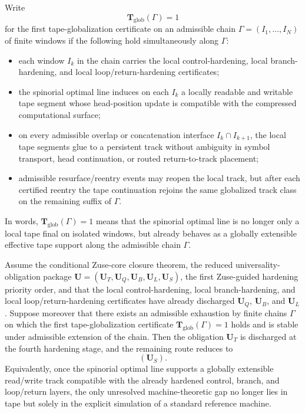 \begin{definition}
Write
\[
\mathbf T_{\mathrm{glob}}(\Gamma)=1
\]
for the first tape-globalization certificate on an admissible chain $\Gamma=(I_1,\dots,I_N)$ of finite windows if the following hold simultaneously along $\Gamma$:
\begin{itemize}[leftmargin=2em]
 \item each window $I_k$ in the chain carries the local control-hardening, local branch-hardening, and local loop/return-hardening certificates;
 \item the spinorial optimal line induces on each $I_k$ a locally readable and writable tape segment whose head-position update is compatible with the compressed computational surface;
 \item on every admissible overlap or concatenation interface $I_k\cap I_{k+1}$, the local tape segments glue to a persistent track without ambiguity in symbol transport, head continuation, or routed return-to-track placement;
 \item admissible resurface/reentry events may reopen the local track, but after each certified reentry the tape continuation rejoins the same globalized track class on the remaining suffix of $\Gamma$.
\end{itemize}
In words, $\mathbf T_{\mathrm{glob}}(\Gamma)=1$ means that the spinorial optimal line is no longer only a local tape final on isolated windows, but already behaves as a globally extensible effective tape support along the admissible chain $\Gamma$.
\end{definition}

\begin{proposition}
Assume the conditional Zuse-core closure theorem, the reduced universality-obligation package \(\mathbf U=(\mathbf U_T,\mathbf U_Q,\mathbf U_B,\mathbf U_L,\mathbf U_S)\), the first Zuse-guided hardening priority order, and that the local control-hardening, local branch-hardening, and local loop/return-hardening certificates have already discharged \(\mathbf U_Q\), \(\mathbf U_B\), and \(\mathbf U_L\). Suppose moreover that there exists an admissible exhaustion by finite chains \(\Gamma\) on which the first tape-globalization certificate \(\mathbf T_{\mathrm{glob}}(\Gamma)=1\) holds and is stable under admissible extension of the chain. Then the obligation \(\mathbf U_T\) is discharged at the fourth hardening stage, and the remaining route reduces to
\[
(\mathbf U_S).
\]
Equivalently, once the spinorial optimal line supports a globally extensible read/write track compatible with the already hardened control, branch, and loop/return layers, the only unresolved machine-theoretic gap no longer lies in tape but solely in the explicit simulation of a standard reference machine.
\end{proposition}

